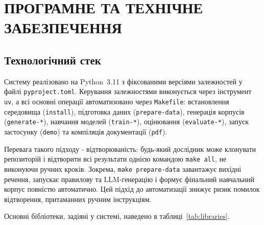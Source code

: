 \documentclass[14pt]{extarticle}
\begin{document}
\clearpage

\section{ПРОГРАМНЕ ТА ТЕХНІЧНЕ ЗАБЕЗПЕЧЕННЯ}

\subsection{Технологічний стек}

Систему реалізовано на Python~3.11 з фіксованими версіями залежностей у файлі \texttt{pyproject.toml}. Керування залежностями виконується через інструмент \texttt{uv}, а всі основні операції автоматизовано через \texttt{Makefile}: встановлення середовища (\texttt{install}), підготовка даних (\texttt{prepare-data}), генерація корпусів (\texttt{generate-*}), навчання моделей (\texttt{train-*}), оцінювання (\texttt{evaluate-*}), запуск застосунку (\texttt{demo}) та компіляція документації (\texttt{pdf}).

Перевага такого підходу - відтворюваність: будь-який дослідник може клонувати репозиторій і відтворити всі результати однією командою \texttt{make all}, не виконуючи ручних кроків. Зокрема, \texttt{make prepare-data} завантажує вихідні речення, запускає правилову та LLM-генерацію і формує фінальний навчальний корпус повністю автоматично. Цей підхід до автоматизації знижує ризик помилок відтворення, притаманних ручним інструкціям.

Основні бібліотеки, задіяні у системі, наведено в таблиці~\ref{tab:libraries}.
\end{document}
